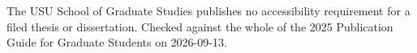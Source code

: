 	{The USU School of Graduate Studies publishes no accessibility requirement
	 for a filed thesis or dissertation. Checked against the whole of the 2025
	 Publication Guide for Graduate Students on 2026-09-13.}

%
\newcommand{\thesis@usu@viceprovost}{[SET THE VICE PROVOST, WITH DEGREE]}
\newcommand{\usuviceprovost}[1]{\renewcommand{\thesis@usu@viceprovost}{#1}}
\newcommand{\thesis@usu@year}{\the\year}
\newcommand{\ususubmissionyear}[1]{\renewcommand{\thesis@usu@year}{#1}}

